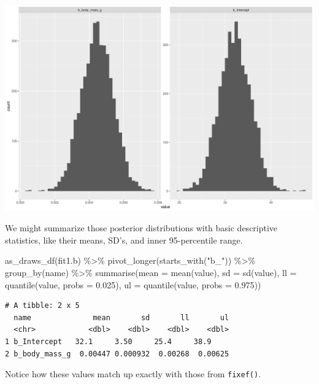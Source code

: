 \documentclass[
  letterpaper,
  DIV=11,
  numbers=noendperiod]{scrartcl}
\newenvironment{Shaded}{\begin{snugshade}}{\end{snugshade}}
\newcommand{\AttributeTok}[1]{\textcolor[rgb]{0.40,0.45,0.13}{#1}}
\newcommand{\FloatTok}[1]{\textcolor[rgb]{0.68,0.00,0.00}{#1}}
\newcommand{\FunctionTok}[1]{\textcolor[rgb]{0.28,0.35,0.67}{#1}}
\newcommand{\NormalTok}[1]{\textcolor[rgb]{0.00,0.23,0.31}{#1}}
\newcommand{\SpecialCharTok}[1]{\textcolor[rgb]{0.37,0.37,0.37}{#1}}
\newcommand{\StringTok}[1]{\textcolor[rgb]{0.13,0.47,0.30}{#1}}
\begin{document}
\includegraphics{Bayes_Lab_1_files/figure-pdf/unnamed-chunk-34-1.pdf}

We might summarize those posterior distributions with basic descriptive
statistics, like their means, SD's, and inner 95-percentile range.

\begin{Shaded}
\begin{Highlighting}[]
\FunctionTok{as\_draws\_df}\NormalTok{(fit1.b) }\SpecialCharTok{\%\textgreater{}\%} 
  \FunctionTok{pivot\_longer}\NormalTok{(}\FunctionTok{starts\_with}\NormalTok{(}\StringTok{"b\_"}\NormalTok{)) }\SpecialCharTok{\%\textgreater{}\%} 
  \FunctionTok{group\_by}\NormalTok{(name) }\SpecialCharTok{\%\textgreater{}\%} 
  \FunctionTok{summarise}\NormalTok{(}\AttributeTok{mean =} \FunctionTok{mean}\NormalTok{(value),}
            \AttributeTok{sd =} \FunctionTok{sd}\NormalTok{(value),}
            \AttributeTok{ll =} \FunctionTok{quantile}\NormalTok{(value, }\AttributeTok{probs =} \FloatTok{0.025}\NormalTok{),}
            \AttributeTok{ul =} \FunctionTok{quantile}\NormalTok{(value, }\AttributeTok{probs =} \FloatTok{0.975}\NormalTok{))}
\end{Highlighting}
\end{Shaded}

\begin{verbatim}
# A tibble: 2 x 5
  name              mean       sd       ll       ul
  <chr>            <dbl>    <dbl>    <dbl>    <dbl>
1 b_Intercept   32.1     3.50     25.4     38.9    
2 b_body_mass_g  0.00447 0.000932  0.00268  0.00625
\end{verbatim}

Notice how these values match up exactly with those from
\texttt{fixef()}.
\end{document}
